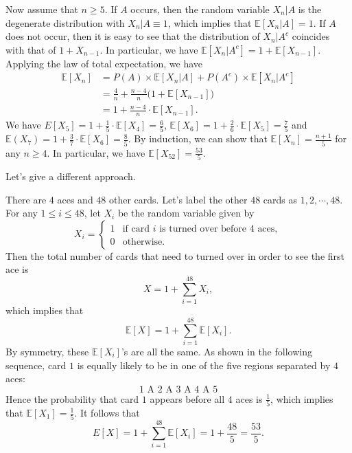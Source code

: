 \documentclass[12pt,letterpaper, onecolumn]{exam}
\begin{document}
\begin{questions}
\begin{solution}
            \quad Now assume that $n\ge 5$. If $A$ occurs, then the random variable $X_n|A$ is the degenerate distribution with $X_n|A\equiv 1$, which implies that $\mathbb{E}[X_n|A]=1$. If $A$ does not occur, then it is easy to see that the distribution of $X_n|A^c$ coincides with that of $1+X_{n-1}$. In particular, we have $\mathbb{E}[X_n|A^c]=1+\mathbb{E}[X_{n-1}]$. Applying the law of total expectation, we have
            \begin{align*}
                \mathbb{E}[X_n]&=P(A)\times\mathbb{E}[X_n|A]+P(A^c)\times\mathbb{E}[X_n|A^c]\\
                &=\frac{4}{n}+\frac{n-4}{n}\big(1+\mathbb{E}[X_{n-1}]\big)\\
                &=1+\frac{n-4}{n}\cdot\mathbb{E}[X_{n-1}].
            \end{align*}
            We have $E[X_5]=1+\frac{1}{5}\cdot\mathbb{E}[X_4]=\frac{6}{5}$, $\mathbb{E}[X_6]=1+\frac{2}{6}\cdot\mathbb{E}[X_5]=\frac{7}{5}$ and $\mathbb{E}(X_7)=1+\frac{3}{7}\cdot\mathbb{E}[X_6]=\frac{8}{5}$. By induction, we can show that $\mathbb{E}[X_n]=\frac{n+1}{5}$ for any $n\ge 4$. In particular, we have $\mathbb{E}[X_{52}]=\frac{53}{5}$.
        \end{solution}
        \quad Let's give a different approach.
        \begin{solution}
            There are $4$ aces and $48$ other cards. Let's label the other $48$ cards as $1,2,\cdots,48$. For any $1\le i\le 48$, let $X_i$ be the random variable given by 
            $$X_i=\begin{cases}
                1&\text{if card $i$ is turned over before $4$ aces},\\
                0&\text{otherwise}.
            \end{cases}$$
            Then the total number of cards that need to turned over in order to see the first ace is
            $$X=1+\sum\limits_{i=1}^{48}X_i,$$
            which implies that 
            $$\mathbb{E}[X]=1+\sum\limits_{i=1}^{48}\mathbb{E}[X_i].$$
            By symmetry, these $\mathbb{E}[X_i]$'s are all the same. As shown in the following sequence, card $1$ is equally likely to be in one of the five regions separated by $4$ aces:
            $$\text{$1$\ A\ $2$\ A\ $3$\ A\ $4$\ A\ $5$}$$
            Hence the probability that card $1$ appears before all $4$ aces is $\frac{1}{5}$, which implies that $\mathbb{E}[X_1]=\frac{1}{5}$. It follows that 
            $$E[X]=1+\sum\limits_{i=1}^{48}\mathbb{E}[X_i]=1+\frac{48}{5}=\frac{53}{5}.$$
        \end{solution}

\end{questions}
\end{document}
